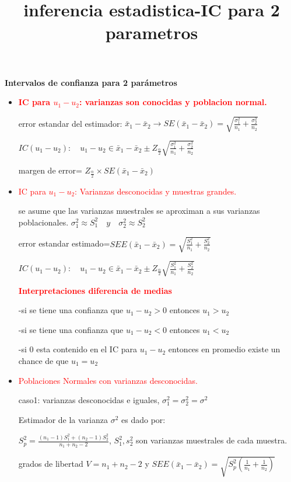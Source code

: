 \documentclass{article}
\begin{document}
\textbf{Intervalos de confianza para 2 parámetros}
\title{inferencia estadistica-IC para 2 parametros}
\begin{itemize}
    \item \textbf{\textcolor{red}{IC para $u_1-u_2$: varianzas son conocidas y poblacion normal.}}

    error estandar del estimador: $\bar{x}_1-\bar{x}_2\rightarrow SE(\bar{x}_1-\bar{x}_2)=\sqrt{\frac{\sigma^2_1}{n_1}+\frac{\sigma^2_2}{n_2}}$

    $IC(u_1-u_2):\quad u_1-u_2\in\bar{x}_1-\bar{x}_2\pm Z_{\frac{\alpha}{2}}\sqrt{\frac{\sigma^2_1}{n_1}+\frac{\sigma^2_2}{n_2}}$

    margen de error= $Z_{\frac{\alpha}{2}}\times SE(\bar{x}_1-\bar{x}_2)$
    \item \textcolor{red}{IC para $u_1-u_2$: Varianzas desconocidas y muestras grandes.}
    
    se asume que las varianzas muestrales se aproximan a sus varianzas poblacionales.
    $\sigma^2_1\approx S^2_1 \quad y\quad \sigma^2_2\approx S^2_2$

    error estandar estimado=$SEE(\bar{x}_1-\bar{x}_2)=\sqrt{\frac{S^2_1}{n_1}+\frac{S^2_2}{n_2}}$

    $IC(u_1-u_2):\quad u_1-u_2\in\bar{x}_1-\bar{x}_2\pm Z_{\frac{\alpha}{2}}\sqrt{\frac{S^2_1}{n_1}+\frac{S^2_2}{n_2}}$

    \textbf{\textcolor{red}{Interpretaciones diferencia de medias}}

    -si se tiene una confianza que $u_1-u_2>0$ entonces $u_1>u_2$

    -si se tiene una confianza que $u_1-u_2<0$ entonces $u_1<u_2$

    -si 0 esta contenido en el IC para $u_1-u_2$ entonces en promedio existe un chance de que $u_1=u_2$

    


    \item \textcolor{red}{Poblaciones Normales con varianzas desconocidas.}
    
    caso1: varianzas desconocidas e iguales, $\sigma^2_1=\sigma^2_2=\sigma^2$

    Estimador de la varianza $\sigma^2$ es dado por:

    $S^2_p=\frac{(n_1-1)S^2_1+(n_2-1)S^2_2}{n_1+n_2-2}$, $S^2_1,s^2_2$ son varianzas muestrales de cada muestra.

    grados de libertad $V=n_1+n_2-2$ y $SEE(\bar{x}_1-\bar{x}_2)=\sqrt{S^2_p\left(\frac{1}{n_1}+\frac{1}{n_2}\right)}$


\end{itemize}
\end{document}
